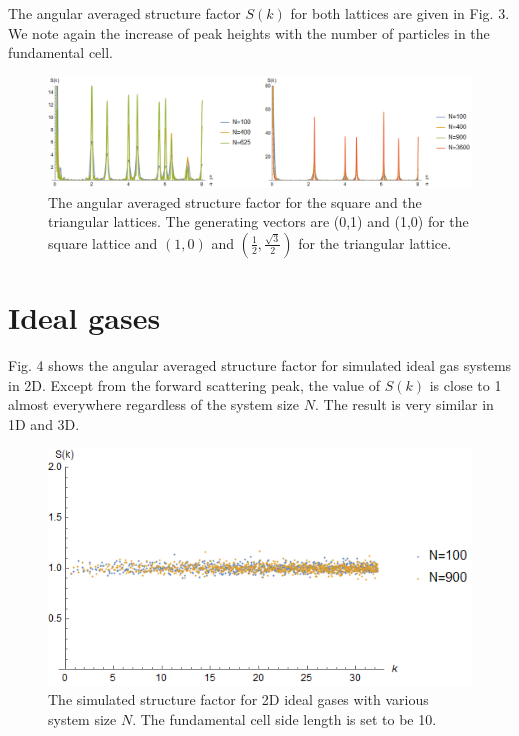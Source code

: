 \documentclass[journal=jacsat,manuscript=article]{achemso}
\begin{document}
	The angular averaged structure factor $S(k)$ for both lattices are given in Fig. 3. We note again the increase of peak heights with the number of particles in the fundamental cell.
	
	\begin{figure}
		\centering
		\includegraphics[width=1\linewidth]{lattice2DangAv}
		\caption{The angular averaged structure factor for the square and the triangular lattices. The generating vectors are (0,1) and (1,0) for the square lattice and $(1,0)$ and $\left(\frac{1}{2},\frac{\sqrt{3}}{2}\right)$ for the triangular lattice.}
		\label{fig:lattice2dangav}
	\end{figure}

	\newpage
	\section{Ideal gases}
	Fig. 4 shows the angular averaged structure factor for simulated ideal gas systems in 2D. Except from the forward scattering peak, the value of $S(k)$ is close to 1 almost everywhere regardless of the system size $N$. The result is very similar in 1D and 3D.
		
	\begin{figure}
		\centering
		\includegraphics[width=1\linewidth]{ideal2D}
		\caption{The simulated structure factor for 2D ideal gases with various system size $N$. The fundamental cell side length is set to be 10.}
		\label{fig:ideal2d}
	\end{figure}
	
\end{document}
